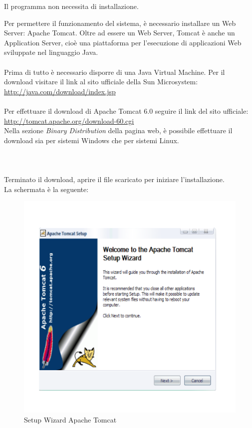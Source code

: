 
Il programma non necessita di installazione. 

Per permettere il funzionamento del sistema, \`e necessario installare un Web Server: Apache Tomcat. Oltre ad essere un Web Server, Tomcat \`e anche un
Application Server, cio\`e una piattaforma per l'esecuzione di applicazioni Web sviluppate nel linguaggio Java.\\
\\
Prima di tutto \`e necessario disporre di una Java Virtual Machine. Per il download visitare il link al sito ufficiale della Sun Microsystem:\\
\href{http://java.com/download/index.jsp}{http://java.com/download/index.jsp}\\
\\
Per effettuare il download di Apache Tomcat 6.0 seguire il link del sito ufficiale: \href{http://tomcat.apache.org/download-60.cgi}{http://tomcat.apache.org/download-60.cgi}\\
Nella sezione \textit{Binary Distribution} della pagina web, \`e possibile effettuare il download sia per sistemi Windows che per sistemi Linux.\\
\\\\
\\
Terminato il download, aprire il file scaricato per iniziare l'installazione.\\
La schermata \`e la seguente:

\begin{figure}[!ht]
\centering
\includegraphics[scale=0.7]{images/InstallTomcat1.png}
\caption{Setup Wizard Apache Tomcat}
\end{figure} 

